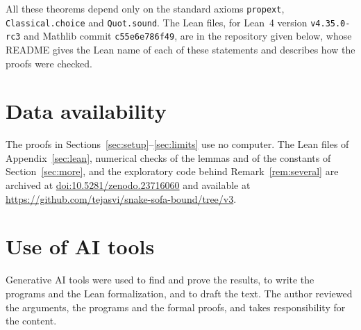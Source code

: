 \documentclass[11pt]{amsart}
\theoremstyle{definition}
\theoremstyle{remark}
\numberwithin{equation}{section}
\newcommand{\ZENODODOI}{10.5281/zenodo.23716060}
\newcommand{\REPOURL}{https://github.com/tejasvi/snake-sofa-bound/tree/v3}
\begin{document}
All these theorems depend only on the standard axioms \texttt{propext}, \texttt{Classical.choice} and \texttt{Quot.sound}. The Lean files, for Lean~4 version \texttt{v4.35.0-rc3} and Mathlib commit \texttt{c55e6e786f49}, are in the repository given below, whose README gives the Lean name of each of these statements and describes how the proofs were checked.

\section*{Data availability}
The proofs in Sections~\ref{sec:setup}--\ref{sec:limits} use no computer. The Lean files of Appendix~\ref{sec:lean}, numerical checks of the lemmas and of the constants of Section~\ref{sec:more}, and the exploratory code behind Remark~\ref{rem:several} are archived at \href{https://doi.org/\ZENODODOI}{doi:\ZENODODOI} and available at \url{\REPOURL}.

\section*{Use of AI tools}
Generative AI tools were used to find and prove the results, to write the programs and the Lean formalization, and to draft the text. The author reviewed the arguments, the programs and the formal proofs, and takes responsibility for the content.
\end{document}
